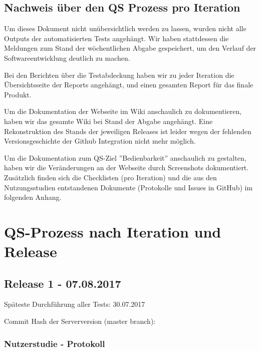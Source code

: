 \documentclass[accentcolor=tud0b,12pt,paper=a4]{tudreport}
\begin{document}
\section{Nachweis über den QS Prozess pro Iteration}
Um dieses Dokument nicht unübersichtlich werden zu lassen, wurden nicht alle Outputs der automatisierten Tests angehängt. Wir haben stattdessen die Meldungen zum Stand der wöchentlichen Abgabe gespeichert, um den Verlauf der Softwareentwicklung deutlich zu machen.

Bei den Berichten über die Testabdeckung haben wir zu jeder Iteration die Übersichtsseite der Reports angehängt, und einen gesamten Report für das finale Produkt.

Um die Dokumentation der Webseite im Wiki anschaulich zu dokumentieren, haben wir das gesamte Wiki bei Stand der Abgabe angehängt. Eine Rekonstruktion des Stands der jeweiligen Releases ist leider wegen der fehlenden Versionsgeschichte der Github Integration nicht mehr möglich.

Um die Dokumentation zum QS-Ziel ''Bedienbarkeit'' anschaulich zu gestalten, haben wir die Veränderungen an der Webseite durch Screenshots dokumentiert. Zusätzlich finden sich die Checklisten (pro Iteration) und die aus den Nutzungsstudien entstandenen Dokumente (Protokolle und Issues in GitHub) im folgenden Anhang.


\chapter{QS-Prozess nach Iteration und Release}













	
\section*{Release 1 - 07.08.2017}
Späteste Durchführung aller Tests: 30.07.2017

Commit Hash der Serverversion (master branch): 

\subsection*{Nutzerstudie - Protokoll}

\end{document}
